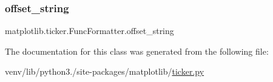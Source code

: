 \mbox{\label{classmatplotlib_1_1ticker_1_1FuncFormatter_ab94ceaf94e148bb8c5291d26c2b3253c}} 
\subsubsection{\texorpdfstring{offset\+\_\+string}{offset\_string}}
{\footnotesize\ttfamily matplotlib.\+ticker.\+Func\+Formatter.\+offset\+\_\+string}



The documentation for this class was generated from the following file\+:\begin{DoxyCompactItemize}
\item 
venv/lib/python3./site-\/packages/matplotlib/\hyperlink{ticker_8py}{ticker.\+py}\end{DoxyCompactItemize}
